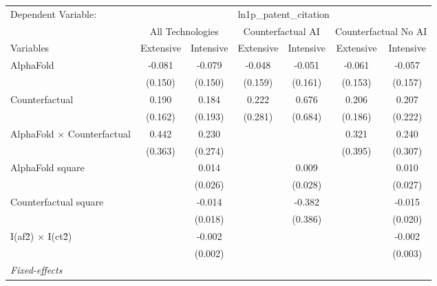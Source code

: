 \begingroup
\centering
\begin{tabular}{lcccccc}
   \tabularnewline \midrule \midrule
   Dependent Variable: & \multicolumn{6}{c}{ln1p\_patent\_citation}\\
 & \multicolumn{2}{c}{All Technologies} & \multicolumn{2}{c}{Counterfactual AI} & \multicolumn{2}{c}{Counterfactual No AI} \\
\cmidrule(lr){1-1}\cmidrule(lr){2-3} \cmidrule(lr){4-5} \cmidrule(lr){6-7}
Variables & \multicolumn{1}{c}{Extensive} & \multicolumn{1}{c}{Intensive} & \multicolumn{1}{c}{Extensive} & \multicolumn{1}{c}{Intensive} & \multicolumn{1}{c}{Extensive} & \multicolumn{1}{c}{Intensive} \\
\cmidrule(lr){1-1}\cmidrule(lr){2-2} \cmidrule(lr){3-3} \cmidrule(lr){4-4} \cmidrule(lr){5-5} \cmidrule(lr){6-6} \cmidrule(lr){7-7}
   AlphaFold                          & -0.081  & -0.079  & -0.048  & -0.051  & -0.061  & -0.057\\   
                                      & (0.150) & (0.150) & (0.159) & (0.161) & (0.153) & (0.157)\\   
   Counterfactual                     & 0.190   & 0.184   & 0.222   & 0.676   & 0.206   & 0.207\\   
                                      & (0.162) & (0.193) & (0.281) & (0.684) & (0.186) & (0.222)\\   
   AlphaFold $\times$ Counterfactual  & 0.442   & 0.230   &         &         & 0.321   & 0.240\\   
                                      & (0.363) & (0.274) &         &         & (0.395) & (0.307)\\   
   AlphaFold square                   &         & 0.014   &         & 0.009   &         & 0.010\\   
                                      &         & (0.026) &         & (0.028) &         & (0.027)\\   
   Counterfactual square              &         & -0.014  &         & -0.382  &         & -0.015\\   
                                      &         & (0.018) &         & (0.386) &         & (0.020)\\   
   I(af\^2) $\times$ I(ct\^2)         &         & -0.002  &         &         &         & -0.002\\   
                                      &         & (0.002) &         &         &         & (0.003)\\   
   \midrule
   \emph{Fixed-effects}\\

\end{tabular}
